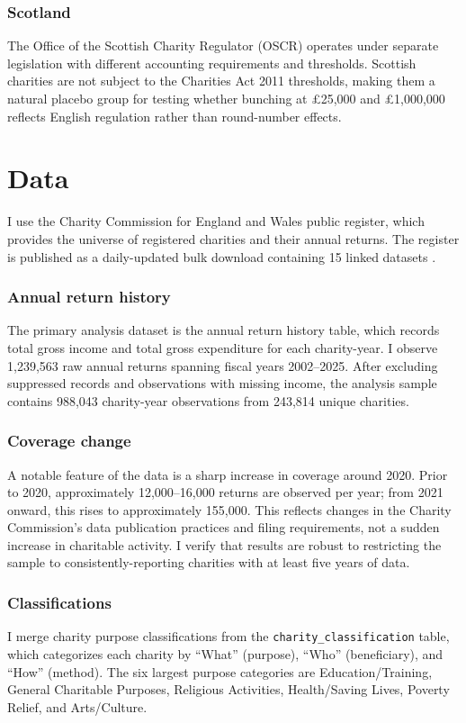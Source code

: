 \documentclass[12pt]{article}
\begin{document}
\subsubsection*{Scotland} The Office of the Scottish Charity Regulator (OSCR) operates under separate legislation with different accounting requirements and thresholds. Scottish charities are not subject to the Charities Act 2011 thresholds, making them a natural placebo group for testing whether bunching at \pounds25,000 and \pounds1,000,000 reflects English regulation rather than round-number effects.


\section{Data}

I use the Charity Commission for England and Wales public register, which provides the universe of registered charities and their annual returns. The register is published as a daily-updated bulk download containing 15 linked datasets \citep{ccdata2025}.

\subsubsection*{Annual return history} The primary analysis dataset is the annual return history table, which records total gross income and total gross expenditure for each charity-year. I observe 1,239,563 raw annual returns spanning fiscal years 2002--2025. After excluding suppressed records and observations with missing income, the analysis sample contains 988,043 charity-year observations from 243,814 unique charities.

\subsubsection*{Coverage change} A notable feature of the data is a sharp increase in coverage around 2020. Prior to 2020, approximately 12,000--16,000 returns are observed per year; from 2021 onward, this rises to approximately 155,000. This reflects changes in the Charity Commission's data publication practices and filing requirements, not a sudden increase in charitable activity. I verify that results are robust to restricting the sample to consistently-reporting charities with at least five years of data.

\subsubsection*{Classifications} I merge charity purpose classifications from the \texttt{charity\_classification} table, which categorizes each charity by ``What'' (purpose), ``Who'' (beneficiary), and ``How'' (method). The six largest purpose categories are Education/Training, General Charitable Purposes, Religious Activities, Health/Saving Lives, Poverty Relief, and Arts/Culture.
\end{document}
